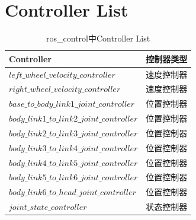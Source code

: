 \section{Controller List}\label{appendix_controllerlist}
\begin{table}[htb]
  \linespread{1.5}
  \centering
  \caption{ros\_control中Controller List}\label{table_controllerlist}
  \begin{tabular}{p{6.5cm}<{\centering\arraybackslash}p{3.5cm}<{\centering\arraybackslash}}
    \toprule
    Controller &  控制器类型  \\ \midrule
    $left\_wheel\_velocity\_controller$         & 速度控制器 \\
    $right\_wheel\_velocity\_controller$        & 速度控制器 \\
    $base\_to\_body\_link1\_joint\_controller$  & 位置控制器 \\
    $body\_link1\_to\_link2\_joint\_controller$ & 位置控制器 \\
    $body\_link2\_to\_link3\_joint\_controller$ & 位置控制器 \\
    $body\_link3\_to\_link4\_joint\_controller$ & 位置控制器 \\
    $body\_link4\_to\_link5\_joint\_controller$ & 位置控制器 \\
    $body\_link5\_to\_link6\_joint\_controller$ & 位置控制器 \\
    $body\_link6\_to\_head\_joint\_controller$  & 位置控制器 \\
    $joint\_state\_controller$                  & 状态控制器 \\
    \bottomrule
    \end{tabular}
\end{table}

